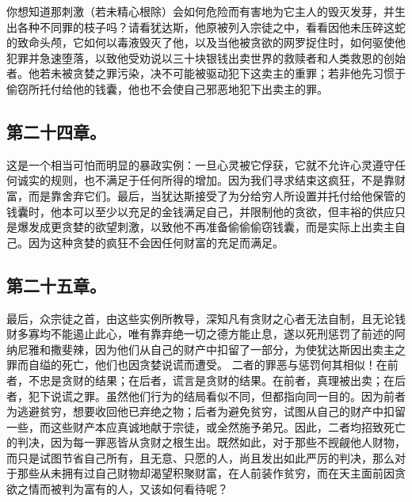 \par

你想知道那刺激（若未精心根除）会如何危险而有害地为它主人的毁灭发芽，并生出各种不同罪的枝子吗？请看犹达斯，他原被列入宗徒之中，看看因他未压碎这蛇的致命头颅，它如何以毒液毁灭了他，以及当他被贪欲的网罗捉住时，如何驱使他犯罪并急速堕落，以致他受劝说以三十块银钱出卖世界的救赎者和人类救恩的创始者。他若未被贪婪之罪污染，决不可能被驱动犯下这卖主的重罪；若非他先习惯于偷窃所托付给他的钱囊，他也不会使自己邪恶地犯下出卖主的罪。\par


\subsection{第二十四章。}

\par

这是一个相当可怕而明显的暴政实例：一旦心灵被它俘获，它就不允许心灵遵守任何诚实的规则，也不满足于任何所得的增加。因为我们寻求结束这疯狂，不是靠财富，而是靠舍弃它们。最后，当犹达斯接受了为分给穷人所设置并托付给他保管的钱囊时，他本可以至少以充足的金钱满足自己，并限制他的贪欲，但丰裕的供应只是爆发成更贪婪的欲望刺激，以致他不再准备偷偷偷窃钱囊，而是实际上出卖主自己。因为这种贪婪的疯狂不会因任何财富的充足而满足。\par


\subsection{第二十五章。}

\par

最后，众宗徒之首，由这些实例所教导，深知凡有贪财之心者无法自制，且无论钱财多寡均不能遏止此心，唯有靠弃绝一切之德方能止息，遂以死刑惩罚了前述的阿纳尼雅和撒斐辣，因为他们从自己的财产中扣留了一部分，为使犹达斯因出卖主之罪而自缢的死亡，他们也因贪婪说谎而遭受。 二者的罪恶与惩罚何其相似！在前者，不忠是贪财的结果；在后者，谎言是贪财的结果。在前者，真理被出卖；在后者，犯下说谎之罪。虽然他们行为的结局看似不同，但都指向同一目的。因为前者为逃避贫穷，想要收回他已弃绝之物；后者为避免贫穷，试图从自己的财产中扣留一些，而这些财产本应真诚地献于宗徒，或全然施予弟兄。因此，二者均招致死亡的判决，因为每一罪恶皆从贪财之根生出。既然如此，对于那些不觊觎他人财物，而只是试图节省自己所有，且无意、只愿的人，尚且发出如此严厉的判决，那么对于那些从未拥有过自己财物却渴望积聚财富，在人前装作贫穷，而在天主面前因贪欲之情而被判为富有的人，又该如何看待呢？\par

